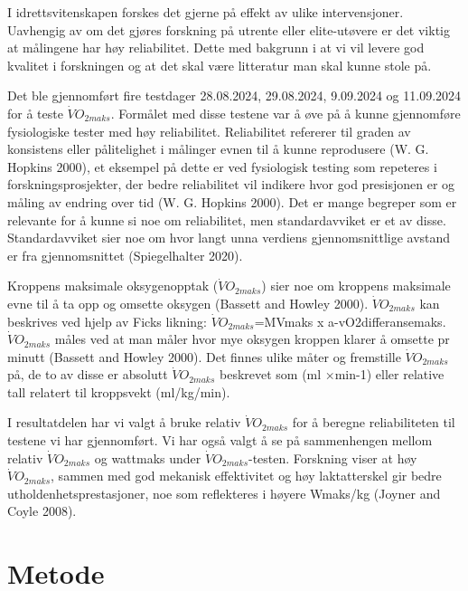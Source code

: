 \documentclass[
  letterpaper,
  DIV=11,
  numbers=noendperiod]{scrreprt}
\begin{document}
I idrettsvitenskapen forskes det gjerne på effekt av ulike
intervensjoner. Uavhengig av om det gjøres forskning på utrente eller
elite-utøvere er det viktig at målingene har høy reliabilitet. Dette med
bakgrunn i at vi vil levere god kvalitet i forskningen og at det skal
være litteratur man skal kunne stole på.

Det ble gjennomført fire testdager 28.08.2024, 29.08.2024, 9.09.2024 og
11.09.2024 for å teste \(\dot{V}O_{2maks}\). Formålet med disse testene
var å øve på å kunne gjennomføre fysiologiske tester med høy
reliabilitet. Reliabilitet refererer til graden av konsistens eller
pålitelighet i målinger evnen til å kunne reprodusere (W. G. Hopkins
2000), et eksempel på dette er ved fysiologisk testing som repeteres i
forskningsprosjekter, der bedre reliabilitet vil indikere hvor god
presisjonen er og måling av endring over tid (W. G. Hopkins 2000). Det
er mange begreper som er relevante for å kunne si noe om reliabilitet,
men standardavviket er et av disse. Standardavviket sier noe om hvor
langt unna verdiens gjennomsnittlige avstand er fra gjennomsnittet
(Spiegelhalter 2020).

Kroppens maksimale oksygenopptak (\(\dot{V}O_{2maks}\)) sier noe om
kroppens maksimale evne til å ta opp og omsette oksygen (Bassett and
Howley 2000). \(\dot{V}O_{2maks}\) kan beskrives ved hjelp av Ficks
likning: \(\dot{V}O_{2maks}\)=MVmaks x a-vO2differansemaks.
\(\dot{V}O_{2maks}\) måles ved at man måler hvor mye oksygen kroppen
klarer å omsette pr minutt (Bassett and Howley 2000). Det finnes ulike
måter og fremstille \(\dot{V}O_{2maks}\) på, de to av disse er absolutt
\(\dot{V}O_{2maks}\) beskrevet som (ml ×min-1) eller relative tall
relatert til kroppsvekt (ml/kg/min).

I resultatdelen har vi valgt å bruke relativ \(\dot{V}O_{2maks}\) for å
beregne reliabiliteten til testene vi har gjennomført. Vi har også valgt
å se på sammenhengen mellom relativ \(\dot{V}O_{2maks}\) og wattmaks
under \(\dot{V}O_{2maks}\)-testen. Forskning viser at høy
\(\dot{V}O_{2maks}\), sammen med god mekanisk effektivitet og høy
laktatterskel gir bedre utholdenhetsprestasjoner, noe som reflekteres i
høyere Wmaks/kg (Joyner and Coyle 2008).

\section{Metode}\label{metode}
\end{document}
